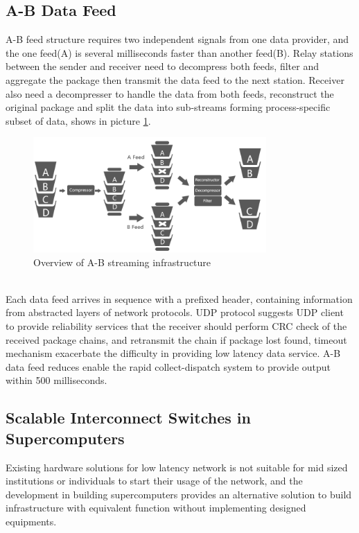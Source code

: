\documentclass[11pt,openright,a4paper]{report}
\begin{document}
\subsection{A-B Data Feed}
A-B feed structure requires two independent signals from one data provider, and the one feed(A) is several milliseconds faster than another feed(B). Relay stations between the sender and receiver need to decompress both feeds, filter and aggregate the package then transmit the data feed to the next station. Receiver also need a decompresser to handle the data from both feeds, reconstruct the original package and split the data into sub-streams forming process-specific subset of data, shows in picture \ref{fig:3}.\\
\begin{figure}[htbp]
	\centering\includegraphics[width=3.5in]{picture/A-BFeed.PNG}
	\caption{Overview of A-B streaming infrastructure}
	\label{fig:3}
\end{figure}\\
Each data feed arrives in sequence with a prefixed header, containing information from abstracted layers of network protocols\cite{udpprotocol}. UDP protocol suggests UDP client to provide reliability services that the receiver should perform CRC check of the received package chains, and retransmit the chain if package lost found, timeout mechanism exacerbate the difficulty in providing low latency data service. A-B data feed reduces enable the rapid collect-dispatch system to provide output within 500 milliseconds\cite{zusman1999fault}.\\

\subsection{Scalable Interconnect Switches in Supercomputers}
Existing hardware solutions for low latency network is not suitable for mid sized institutions or individuals to start their usage of the network, and the development in building supercomputers provides an alternative solution to build infrastructure with equivalent function without implementing designed equipments.
\end{document}
